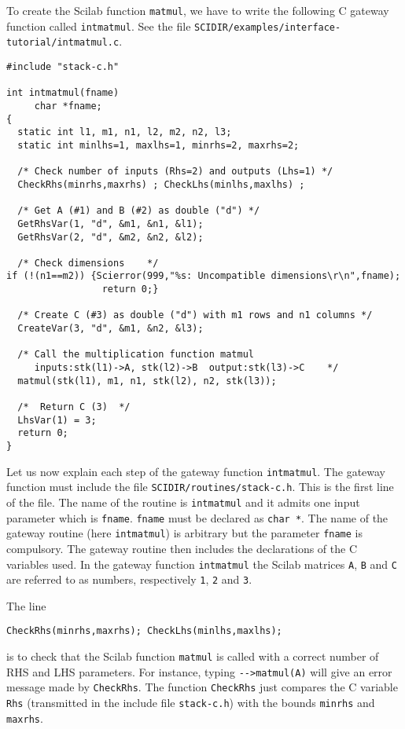 To create the Scilab function \verb!matmul!, we have to write 
the following C gateway function called
\verb!intmatmul!. See the file \newline
\verb!SCIDIR/examples/interface-tutorial/intmatmul.c!.

\scriptsize
\begin{verbatim}
#include "stack-c.h"

int intmatmul(fname) 
     char *fname;
{
  static int l1, m1, n1, l2, m2, n2, l3;
  static int minlhs=1, maxlhs=1, minrhs=2, maxrhs=2;

  /* Check number of inputs (Rhs=2) and outputs (Lhs=1) */
  CheckRhs(minrhs,maxrhs) ; CheckLhs(minlhs,maxlhs) ;

  /* Get A (#1) and B (#2) as double ("d") */
  GetRhsVar(1, "d", &m1, &n1, &l1); 
  GetRhsVar(2, "d", &m2, &n2, &l2); 

  /* Check dimensions    */
if (!(n1==m2)) {Scierror(999,"%s: Uncompatible dimensions\r\n",fname);
                 return 0;}

  /* Create C (#3) as double ("d") with m1 rows and n1 columns */
  CreateVar(3, "d", &m1, &n2, &l3);   

  /* Call the multiplication function matmul
     inputs:stk(l1)->A, stk(l2)->B  output:stk(l3)->C    */
  matmul(stk(l1), m1, n1, stk(l2), n2, stk(l3));

  /*  Return C (3)  */
  LhsVar(1) = 3;
  return 0;
}
\end{verbatim}
\normalsize

Let us now explain each step of the gateway function \verb!intmatmul!.
The gateway function must include the file \verb!SCIDIR/routines/stack-c.h!.
This is the first line of the file. 
The name of the routine is \verb!intmatmul!
and it admits one input parameter which is \verb!fname!. 
\verb!fname! must be declared as \verb!char *!. The name of the gateway
routine (here \verb!intmatmul!) is arbitrary but the parameter 
\verb!fname! is compulsory.
The gateway routine then includes the declarations of the C variables used.
In the gateway function \verb!intmatmul! the Scilab matrices 
\verb!A!, \verb!B! and \verb!C! are referred to as numbers,
respectively \verb!1!, \verb!2! and \verb!3!. 

The line 
\begin{verbatim}
CheckRhs(minrhs,maxrhs); CheckLhs(minlhs,maxlhs);
\end{verbatim}
is to check that the Scilab function \verb!matmul! is called with
a correct number of RHS and LHS parameters. For instance, typing 
\verb!-->matmul(A)! will give an error message made by \verb!CheckRhs!.
The function \verb!CheckRhs! just compares the C variable \verb!Rhs!
(transmitted in the include file \verb!stack-c.h!) with the bounds
\verb!minrhs! and \verb!maxrhs!.

